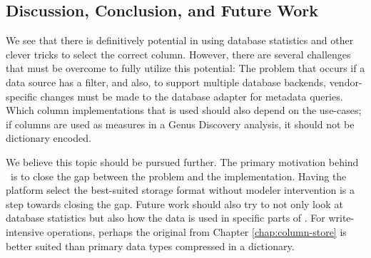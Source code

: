 \subsection{Discussion, Conclusion, and Future Work}
\label{sub:Discussion, Conclusion, and Future Work}
We see that there is definitively potential in using database statistics and other clever tricks to select the correct column. However, there are several challenges that must be overcome to fully utilize this potential: The problem that occurs if a data source has a filter, and also, to support multiple database backends, vendor-specific changes must be made to the database adapter for metadata queries. Which column implementations that is used should also depend on the use-cases; if columns are used as measures in a Genus Discovery analysis, it should not be dictionary encoded.

We believe this topic should be pursued further. The primary motivation behind \mde~is to close the gap between the problem and the implementation. Having the platform select the best-suited storage format without modeler intervention is a step towards closing the gap. Future work should also try to not only look at database statistics but also how the data is used in specific parts of \gap. For write-intensive operations, perhaps the original  from Chapter \ref{chap:column-store} is better suited than primary data types compressed in a dictionary.
